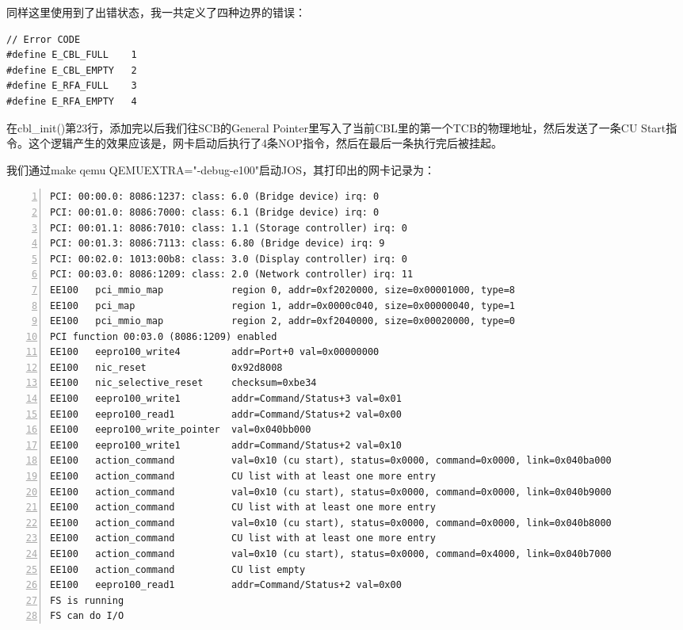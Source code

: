 \documentclass{article}
\newcommand{\funcname}[1]{{\ttfamily \small #1}}
\begin{document}
\begin{CJK*}{UTF8}{gkai}
同样这里使用到了出错状态，我一共定义了四种边界的错误：


\begin{lstlisting}[style=ccode, title={\scriptsize \ttfamily \bfseries kern/e100.h}]
// Error CODE
#define E_CBL_FULL    1
#define E_CBL_EMPTY   2
#define E_RFA_FULL    3
#define E_RFA_EMPTY   4
\end{lstlisting}


在\funcname{cbl\_init()}第23行，添加完以后我们往SCB的General Pointer里写入了当前CBL里的第一个TCB的物理地址，然后发送了一条CU Start指令。这个逻辑产生的效果应该是，网卡启动后执行了4条NOP指令，然后在最后一条执行完后被挂起。

我们通过make qemu QEMUEXTRA="-debug-e100"启动JOS，其打印出的网卡记录为：

\begin{lstlisting}[style=console, numbers=left, basicstyle=\tiny\color{green}\ttfamily\bfseries]
PCI: 00:00.0: 8086:1237: class: 6.0 (Bridge device) irq: 0
PCI: 00:01.0: 8086:7000: class: 6.1 (Bridge device) irq: 0
PCI: 00:01.1: 8086:7010: class: 1.1 (Storage controller) irq: 0
PCI: 00:01.3: 8086:7113: class: 6.80 (Bridge device) irq: 9
PCI: 00:02.0: 1013:00b8: class: 3.0 (Display controller) irq: 0
PCI: 00:03.0: 8086:1209: class: 2.0 (Network controller) irq: 11
EE100	pci_mmio_map            region 0, addr=0xf2020000, size=0x00001000, type=8
EE100	pci_map                 region 1, addr=0x0000c040, size=0x00000040, type=1
EE100	pci_mmio_map            region 2, addr=0xf2040000, size=0x00020000, type=0
PCI function 00:03.0 (8086:1209) enabled
EE100	eepro100_write4         addr=Port+0 val=0x00000000
EE100	nic_reset               0x92d8008
EE100	nic_selective_reset     checksum=0xbe34
EE100	eepro100_write1         addr=Command/Status+3 val=0x01
EE100	eepro100_read1          addr=Command/Status+2 val=0x00
EE100	eepro100_write_pointer  val=0x040bb000
EE100	eepro100_write1         addr=Command/Status+2 val=0x10
EE100	action_command          val=0x10 (cu start), status=0x0000, command=0x0000, link=0x040ba000
EE100	action_command          CU list with at least one more entry
EE100	action_command          val=0x10 (cu start), status=0x0000, command=0x0000, link=0x040b9000
EE100	action_command          CU list with at least one more entry
EE100	action_command          val=0x10 (cu start), status=0x0000, command=0x0000, link=0x040b8000
EE100	action_command          CU list with at least one more entry
EE100	action_command          val=0x10 (cu start), status=0x0000, command=0x4000, link=0x040b7000
EE100	action_command          CU list empty
EE100	eepro100_read1          addr=Command/Status+2 val=0x00
FS is running
FS can do I/O
\end{lstlisting}


\end{CJK*}
\end{document}
